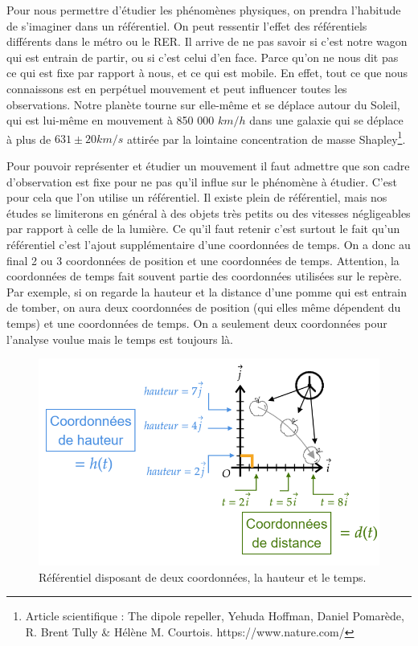 \documentclass[
	11pt, %
	fleqn, %
	a4paper, %
]{LegrandOrangeBook}
\begin{document}
Pour nous permettre d'étudier les phénomènes physiques, on prendra l'habitude de s'imaginer dans un référentiel. On peut ressentir l'effet des référentiels différents dans le métro ou le RER. Il arrive de ne pas savoir si c'est notre wagon qui est entrain de partir, ou si c'est celui d'en face. Parce qu'on ne nous dit pas ce qui est fixe par rapport à nous, et ce qui est mobile. En effet, tout ce que nous connaissons est en perpétuel mouvement et peut influencer toutes les observations. Notre planète tourne sur elle-même et se déplace autour du Soleil, qui est lui-même en mouvement à 850 000 $km/h$ dans une galaxie qui se déplace à plus de $631\pm 20 km/s$ attirée par la lointaine concentration de masse Shapley\footnote{Article scientifique : The dipole repeller, Yehuda Hoffman, Daniel Pomarède, R. Brent Tully \& Hélène M. Courtois. https://www.nature.com/}.

Pour pouvoir représenter et étudier un mouvement il faut admettre que son cadre d'observation est fixe pour ne pas qu'il influe sur le phénomène à étudier. C'est pour cela que l'on utilise un référentiel. Il existe plein de référentiel, mais nos études se limiterons en général à des objets très petits ou des vitesses négligeables par rapport à celle de la lumière. Ce qu'il faut retenir c'est surtout le fait qu'un référentiel c'est l'ajout supplémentaire d'une coordonnées de temps. On a donc au final 2 ou 3 coordonnées de position et une coordonnées de temps. Attention, la coordonnées de temps fait souvent partie des coordonnées utilisées sur le repère. Par exemple, si on regarde la hauteur et la distance d'une pomme qui est entrain de tomber, on aura deux coordonnées de position (qui elles même dépendent du temps) et une coordonnées de temps. On a seulement deux coordonnées pour l'analyse voulue mais le temps est toujours là.



\begin{figure}[H] %
	\centering %
	\includegraphics[width=1\textwidth]{Images/ref2.png} %
	\caption{Référentiel disposant de deux coordonnées, la hauteur et le temps.}
	\label{ref2} %
\end{figure}
\end{document}
